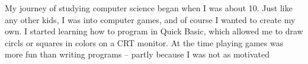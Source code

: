
My journey of studying computer science began when I was about 10.
Just like any other kids, I was into computer games, and of course I wanted to create my own. 
I started learning how to program in Quick Basic, which allowed me to draw circls or squares in colors on a CRT monitor.
At the time playing games was more fun than writing programs -- partly because I was not as motivated
